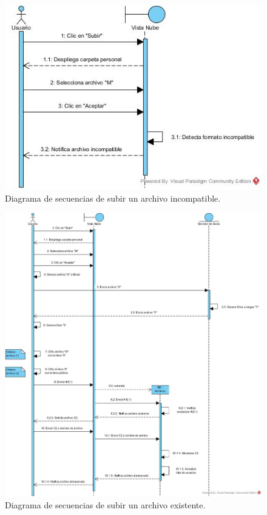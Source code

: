 \begin{figure}[htbp!]
		\centering
			\includegraphics[width=1\textwidth]{images/Subir_trayectoria_b}
		\caption{Diagrama de secuencias de subir un archivo incompatible.}
\end{figure}

\begin{figure}[htbp!]
		\centering
			\includegraphics[width=1\textwidth]{images/Subir_trayectoria_c}
		\caption{Diagrama de secuencias de subir un archivo existente.}
\end{figure} 
\newpage

